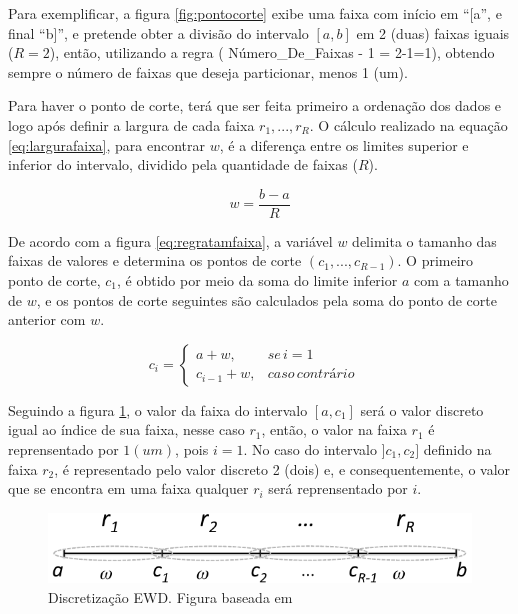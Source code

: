 Para exemplificar, a figura \ref{fig:pontocorte} exibe uma faixa com início em ``[a'', e final ``b]'', e pretende obter a divisão do intervalo ${[a,b]}$ em 2 (duas) faixas iguais (${R=2}$), então, utilizando a regra ( Número\_De\_Faixas - 1 =  2-1=1), obtendo sempre o número de faixas que deseja particionar, menos 1 (um).

Para haver o ponto de corte, terá que ser feita primeiro a ordenação dos dados e logo após definir a largura de cada faixa ${r_1,...,r_R}$. O cálculo realizado na equação \ref{eq:largurafaixa}, para encontrar ${w}$, é a diferença entre os limites superior e inferior do intervalo, dividido pela quantidade de faixas (${R}$).

\begin{equation}
 w = \frac{b-a}{R}
 \label{eq:largurafaixa}
\end{equation}

De acordo com a figura \ref{eq:regratamfaixa}, a variável ${w}$ delimita o tamanho das faixas de valores e determina os pontos de corte ${(c_1,...,c_{R-1})}$. O primeiro ponto de corte, ${c_1}$, é obtido por meio da soma do limite inferior ${a}$ com a tamanho de ${w}$, e os pontos de corte seguintes são calculados pela soma do ponto de corte anterior com ${w}$.

\begin{equation}
c_i=\left\{\begin{matrix}
a+w, & se\, i=1 & \\ 
c_{i-1}+w,  & caso\, contrário & 
\end{matrix}\right.
 \label{eq:regratamfaixa}
\end{equation}


Seguindo a figura \ref{fig:faixasEWD}, o valor da faixa do intervalo ${[a,c_1]}$ será o valor discreto igual ao índice de sua faixa, nesse caso ${r_1}$, então, o valor na faixa ${r_1}$ é reprensentado por ${1(um)}$, pois  ${i=1}$. No caso do intervalo ${]c_1,c_2]}$ definido na faixa  ${r_2}$, é representado pelo valor discreto 2 (dois) e, e consequentemente, o valor que se encontra em uma faixa qualquer ${r_i}$ será reprensentado por ${i}$.

\begin{figure}[h] 
        \centering
        \includegraphics[scale=0.6]{figs/discretizacaoEWD.png}
        \caption[Discretização EWD]{Discretização EWD. Figura baseada em \cite{Lopes2016}}%
        \label{fig:faixasEWD}
\end{figure}

